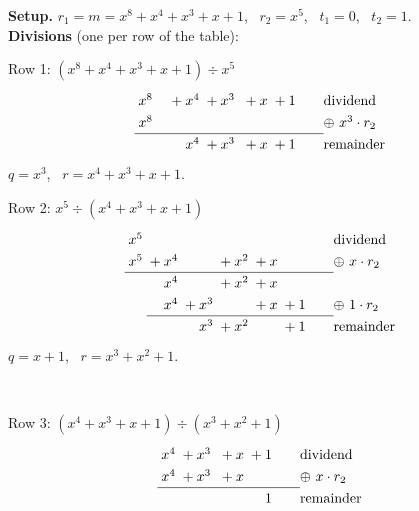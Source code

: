 \begin{worked}
\textbf{Setup.} $r_1 = m = x^8 + x^4 + x^3 + x + 1$, \ $r_2 = x^5$, \ $t_1 = 0$, \ $t_2 = 1$.\\[2pt]
\textbf{Divisions} (one per row of the table):\\[2pt]
\begin{minipage}[t]{0.5\linewidth}
Row 1: $(x^8 + x^4 + x^3 + x + 1) \div x^5$
\[
\renewcommand{\arraystretch}{1.3}\begin{array}{@{}*{9}{@{\;}r}@{\qquad}l@{}}
x^{8} &  &  &  & {}+x^{4} & {}+x^{3} &  & {}+x & {}+1 & \text{dividend}\\
x^{8} &  &  &  &  &  &  &  &  & \oplus\ x^{3}\cdot r_2\\
\cline{1-9}
 &  &  &  & x^{4} & {}+x^{3} &  & {}+x & {}+1  & \text{remainder}\\
\end{array}
\]
$q = x^3$, \ $r = x^4 + x^3 + x + 1$.
\end{minipage}%
\begin{minipage}[t]{0.5\linewidth}
Row 2: $x^5 \div (x^4 + x^3 + x + 1)$
\[
\renewcommand{\arraystretch}{1.3}\begin{array}{@{}*{6}{@{\;}r}@{\qquad}l@{}}
x^{5} &  &  &  &  &  & \text{dividend}\\
x^{5} & {}+x^{4} &  & {}+x^{2} & {}+x &  & \oplus\ x\cdot r_2\\
\cline{1-6}
 & x^{4} &  & {}+x^{2} & {}+x &  & \\
 & x^{4} & {}+x^{3} &  & {}+x & {}+1 & \oplus\ 1\cdot r_2\\
\cline{2-6}
 &  & x^{3} & {}+x^{2} &  & {}+1  & \text{remainder}\\
\end{array}
\]
$q = x + 1$, \ $r = x^3 + x^2 + 1$.
\end{minipage}\\[4pt]
\begin{minipage}[t]{0.5\linewidth}
Row 3: $(x^4 + x^3 + x + 1) \div (x^3 + x^2 + 1)$
\[
\renewcommand{\arraystretch}{1.3}\begin{array}{@{}*{5}{@{\;}r}@{\qquad}l@{}}
x^{4} & {}+x^{3} &  & {}+x & {}+1 & \text{dividend}\\
x^{4} & {}+x^{3} &  & {}+x &  & \oplus\ x\cdot r_2\\
\cline{1-5}
 &  &  &  & 1  & \text{remainder}\\
\end{array}
\]

\end{minipage}
\end{worked}
